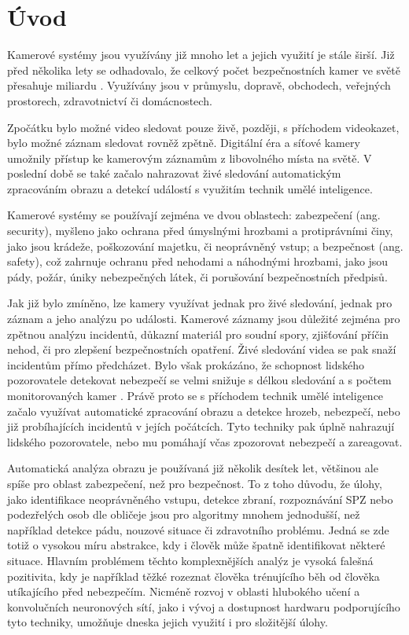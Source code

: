 \chapter{Úvod}
\label{chap:Introduction}

Kamerové systémy jsou využívány již mnoho let a jejich využití je stále širší.
Již před několika lety se odhadovalo, že celkový počet bezpečnostních kamer ve
světě přesahuje miliardu \cite{surveillance}. Využívány jsou v průmyslu,
dopravě, obchodech, veřejných prostorech, zdravotnictví či domácnostech.

Zpočátku bylo možné video sledovat pouze živě, později, s příchodem videokazet,
bylo možné záznam sledovat rovněž zpětně. Digitální éra a síťové kamery
umožnily přístup ke kamerovým záznamům z libovolného místa na světě. V poslední
době se také začalo nahrazovat živé sledování automatickým zpracováním obrazu a
detekcí událostí s využitím technik umělé inteligence.

Kamerové systémy se používají zejména ve dvou oblastech: zabezpečení (ang.
security), myšleno jako ochrana před úmyslnými hrozbami a protiprávními činy,
jako jsou krádeže, poškozování majetku, či neoprávněný vstup; a bezpečnost
(ang. safety), což zahrnuje ochranu před nehodami a náhodnými hrozbami, jako
jsou pády, požár, úniky nebezpečných látek, či porušování bezpečnostních
předpisů.

Jak již bylo zmíněno, lze kamery využívat jednak pro živé sledování, jednak pro
záznam a jeho analýzu po události. Kamerové záznamy jsou důležité zejména pro
zpětnou analýzu incidentů, důkazní materiál pro soudní spory, zjišťování příčin
nehod, či pro zlepšení bezpečnostních opatření. Živé sledování videa se pak
snaží incidentům přímo předcházet. Bylo však prokázáno, že schopnost lidského
pozorovatele detekovat nebezpečí se velmi snižuje s délkou sledování a s počtem
monitorovaných kamer \cite{soton371614}. Právě proto se s příchodem technik
umělé inteligence začalo využívat automatické zpracování obrazu a detekce
hrozeb, nebezpečí, nebo již probíhajících incidentů v jejích počátcích. Tyto
techniky pak úplně nahrazují lidského pozorovatele, nebo mu pomáhají včas
zpozorovat nebezpečí a zareagovat.

Automatická analýza obrazu je používaná již několik desítek let, většinou ale
spíše pro oblast zabezpečení, než pro bezpečnost. To z toho důvodu, že úlohy,
jako identifikace neoprávněného vstupu, detekce zbraní, rozpoznávání SPZ nebo
podezřelých osob dle obličeje jsou pro algoritmy mnohem jednodušší, než
například detekce pádu, nouzové situace či zdravotního problému. Jedná se zde
totiž o vysokou míru abstrakce, kdy i člověk může špatně identifikovat některé
situace. Hlavním problémem těchto komplexnějších analýz je vysoká falešná
pozitivita, kdy je například těžké rozeznat člověka trénujícího běh od člověka
utíkajícího před nebezpečím. Nicméně rozvoj v oblasti hlubokého učení a
konvolučních neuronových sítí, jako i vývoj a dostupnost hardwaru podporujícího
tyto techniky, umožňuje dneska jejich využití i pro složitější úlohy.

